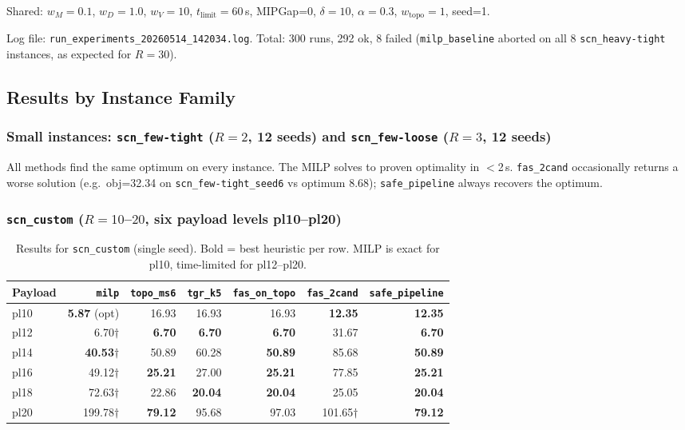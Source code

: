 Shared: $w_M=0.1$, $w_D=1.0$, $w_V=10$, $t_{\text{limit}}=60$\,s,
MIPGap=0, $\delta=10$, $\alpha=0.3$, $w_{\text{topo}}=1$, seed=1.

Log file: \texttt{run\_experiments\_20260514\_142034.log}.
Total: 300 runs, 292 ok, 8 failed (\texttt{milp\_baseline} aborted on all
8 \texttt{scn\_heavy-tight} instances, as expected for $R=30$).

\subsection{Results by Instance Family}

\subsubsection{Small instances: \texttt{scn\_few-tight} ($R=2$, 12 seeds) and \texttt{scn\_few-loose} ($R=3$, 12 seeds)}

All methods find the same optimum on every instance.  The MILP solves to
proven optimality in $<$2\,s.  \texttt{fas\_2cand} occasionally returns a
worse solution (e.g.\ obj=32.34 on \texttt{scn\_few-tight\_seed6} vs
optimum 8.68); \texttt{safe\_pipeline} always recovers the optimum.

\subsubsection{\texttt{scn\_custom} ($R=10$--$20$, six payload levels pl10--pl20)}

\begin{table}[h]
\centering
\caption{Results for \texttt{scn\_custom} (single seed).
Bold = best heuristic per row.  MILP is exact for pl10, time-limited for pl12--pl20.}
\label{tab:exp06-custom}
\begin{tabular}{lrrrrrr}
\toprule
Payload & \texttt{milp} & \texttt{topo\_ms6} & \texttt{tgr\_k5} & \texttt{fas\_on\_topo} & \texttt{fas\_2cand} & \texttt{safe\_pipeline} \\
\midrule
pl10  &  \textbf{5.87} (opt) &  16.93 &  16.93 &  16.93 & \textbf{12.35} & \textbf{12.35} \\
pl12  &  6.70$\dagger$        &  \textbf{6.70}  &  \textbf{6.70}  &  \textbf{6.70}  & 31.67 & \textbf{6.70} \\
pl14  & \textbf{40.53}$\dagger$ & 50.89 & 60.28 & \textbf{50.89} & 85.68 & \textbf{50.89} \\
pl16  & 49.12$\dagger$        & \textbf{25.21} & 27.00 & \textbf{25.21} & 77.85 & \textbf{25.21} \\
pl18  & 72.63$\dagger$        & 22.86 & \textbf{20.04} & \textbf{20.04} & 25.05 & \textbf{20.04} \\
pl20  & 199.78$\dagger$       & \textbf{79.12} & 95.68 & 97.03 & 101.65$\dagger$ & \textbf{79.12} \\
\bottomrule
\end{tabular}
\end{table}


